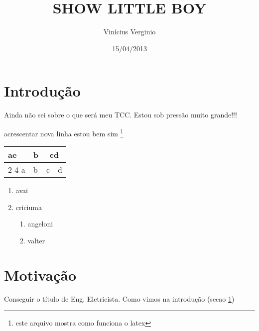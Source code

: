 \documentclass{article}
\author{Vinícius Verginio}
\date{15/04/2013}
\title{SHOW LITTLE BOY}
\begin{document}
\maketitle

\newpage
\section{Introdução}
\label{sec:intro} %
Ainda não sei sobre o que será meu TCC. Estou sob pressão muito grande!!! %

acrescentar nova linha
\hfill estou bem sim %
\footnote{este arquivo mostra como funciona o latex} %

\begin{table}
\begin{tabular}{|l|l|l|r|} %
\multirow{2}{*}{ae}
	a & b & \multicolumn{2}{c}{cd} \\
	\cline{2-4}
	a & b & c & d \\ 
	
\end{tabular}
\end{table}




\begin{enumerate}
	\item avai
	\item criciuma
		\begin{enumerate}[label*=\arabic*.]
		\item angeloni
		\item valter
		
		\end{enumerate}
\end{enumerate}
\newpage
\section{Motivação}
\label{sec:motiv}
Conseguir o título de Eng. Eletricista.
Como vimos na introdução (secao \ref{sec:intro}) %
\end{document}
